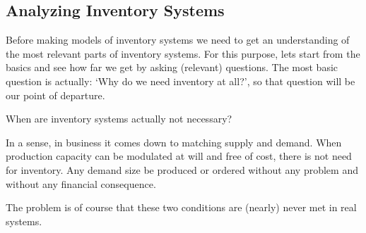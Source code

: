 \subsection{Analyzing Inventory Systems}
\label{sec:analyz-invent-syst}

Before making models of inventory systems we need to get an
understanding of the most relevant parts of inventory systems.  For
this purpose, lets start from the basics and see how far we get by
asking (relevant) questions.  The most basic question is actually:
`Why do we need inventory at all?', so that question will be our point
of departure.

\begin{question}
  When are inventory systems actually not necessary?
\begin{solution}
  In a sense, in business it comes down to matching supply and
  demand. When production capacity can be modulated at will and free of cost,
  there is not need for inventory. Any demand size be produced or
  ordered without any problem and without any financial consequence.

  The problem is of course that these two conditions are (nearly)
  never met in real systems.
\end{solution}
\end{question}



